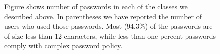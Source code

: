 \begin{figure}[t]
  \caption{Figure shows number of passwords in each of the classes we described
    above. In parentheses we have reported the number of users who used those passwords.  Most (94.3\%) of the passwords are of size less than 12
    characters, while less than one percent passwords comply with complex
    password policy.  }
  \label{fig:group-summary}
\end{figure}

\fi



